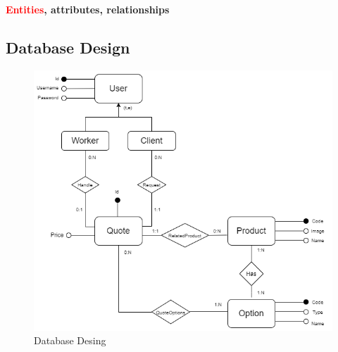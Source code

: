 \documentclass[a4paper, 12pt]{article}
\begin{document}
\noindent \textbf{\textcolor{red}{Entities}, \textcolor{myGreen}{attributes}, \textcolor{myBlue}{relationships}}
\newpage
\subsection{Database Design}
\begin{figure}[h!]
	\centering
	\includegraphics[width=1\textwidth]{quotemanagementdesign.png}
	\caption{Database Desing}
	\label{figure:database_design}
\end{figure}
\end{document}
